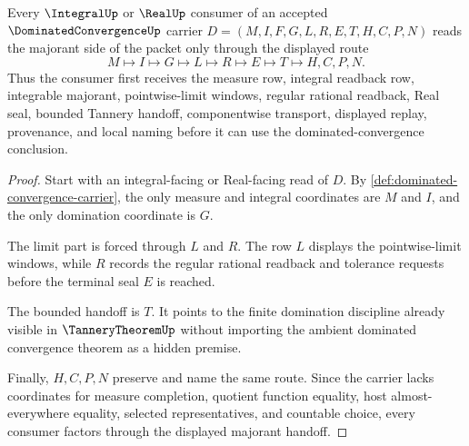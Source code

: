 \begin{theorem}
\label{thm:dominated-convergence-majorant-handoff}
Every $\IntegralUp$ or $\RealUp$ consumer of an accepted $\DominatedConvergenceUp$ carrier $D=(M,I,F,G,L,R,E,T,H,C,P,N)$ reads the majorant side of the packet only through the displayed route
$$
M \longmapsto I \longmapsto G \longmapsto L \longmapsto R \longmapsto E \longmapsto T \longmapsto H,C,P,N .
$$
Thus the consumer first receives the measure row, integral readback row, integrable majorant, pointwise-limit windows, regular rational readback, Real seal, bounded Tannery handoff, componentwise transport, displayed replay, provenance, and local naming before it can use the dominated-convergence conclusion.
\end{theorem}
\begin{proof}
Start with an integral-facing or Real-facing read of $D$. By \autoref{def:dominated-convergence-carrier}, the only measure and integral coordinates are $M$ and $I$, and the only domination coordinate is $G$.

The limit part is forced through $L$ and $R$. The row $L$ displays the pointwise-limit windows, while $R$ records the regular rational readback and tolerance requests before the terminal seal $E$ is reached.

The bounded handoff is $T$. It points to the finite domination discipline already visible in $\TanneryTheoremUp$ without importing the ambient dominated convergence theorem as a hidden premise.

Finally, $H,C,P,N$ preserve and name the same route. Since the carrier lacks coordinates for measure completion, quotient function equality, host almost-everywhere equality, selected representatives, and countable choice, every consumer factors through the displayed majorant handoff.
\end{proof}

